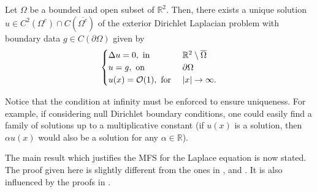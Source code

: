 \begin{theorem}
    Let \(\Omega\) be a bounded and open subset of \(\mathbb{R}^2\). Then, there exists a unique solution \(u \in C^2(\Omega^c) \cap C(\overline{\Omega^c})\) of the exterior Dirichlet Laplacian problem with boundary data \(g \in C(\partial\Omega)\) given by
    \[
        \begin{cases}
            \Delta u = 0, \text{ in } & \mathbb{R}^2\setminus \overline{\Omega}\\
            u = g, \text{ on } & \partial \Omega\\
            u(x) = \mathcal{O}(1), \text{ for } & \abs{x} \rightarrow \infty.
        \end{cases}
    \]
\end{theorem}

\begin{remark}
    Notice that the condition at infinity must be enforced to ensure uniqueness. For example, if considering null Dirichlet boundary conditions, one could easily find a family of solutions up to a multiplicative constant (if \(u(x)\) is a solution, then \(\alpha u(x)\) would also be a solution for any \(\alpha \in \mathbb{R}\)).
\end{remark}

The main result which justifies the \ac{MFS} for the Laplace equation is now stated. The proof given here is slightly different from the ones in \cite{bogomolny1985fundamental}, \cite{alves2009choice} and \cite{smyrlis2009applicability}. It is also influenced by the proofs in \cite{svilen_phd}.

